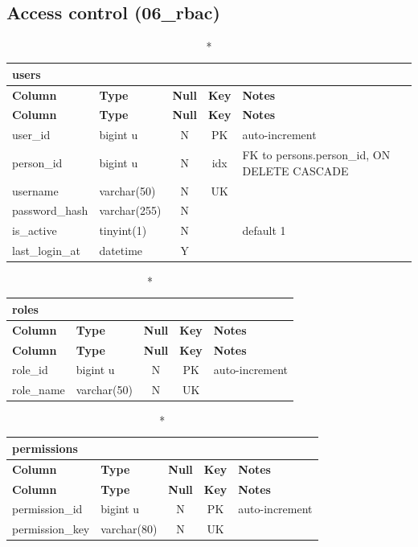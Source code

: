 \subsection*{Access control (06\_rbac)}
\begin{longtable}{@{}p{3.4cm}p{2.9cm}c c p{5.6cm}@{}}
\caption*{\textbf{users}}\\
\toprule \textbf{Column} & \textbf{Type} & \textbf{Null} & \textbf{Key} & \textbf{Notes} \\ \midrule \endfirsthead
\toprule \textbf{Column} & \textbf{Type} & \textbf{Null} & \textbf{Key} & \textbf{Notes} \\ \midrule \endhead
\bottomrule \endlastfoot
user\_\allowbreak{}id & bigint u & N & PK & auto-increment \\
person\_\allowbreak{}id & bigint u & N & idx & FK to persons.person\_\allowbreak{}id, ON DELETE CASCADE \\
username & varchar(50) & N & UK &  \\
password\_\allowbreak{}hash & varchar(255) & N &  &  \\
is\_\allowbreak{}active & tinyint(1) & N &  & default 1 \\
last\_\allowbreak{}login\_\allowbreak{}at & datetime & Y &  &  \\
\end{longtable}
\vspace{-0.4em}
\begin{longtable}{@{}p{3.4cm}p{2.9cm}c c p{5.6cm}@{}}
\caption*{\textbf{roles}}\\
\toprule \textbf{Column} & \textbf{Type} & \textbf{Null} & \textbf{Key} & \textbf{Notes} \\ \midrule \endfirsthead
\toprule \textbf{Column} & \textbf{Type} & \textbf{Null} & \textbf{Key} & \textbf{Notes} \\ \midrule \endhead
\bottomrule \endlastfoot
role\_\allowbreak{}id & bigint u & N & PK & auto-increment \\
role\_\allowbreak{}name & varchar(50) & N & UK &  \\
\end{longtable}
\vspace{-0.4em}
\begin{longtable}{@{}p{3.4cm}p{2.9cm}c c p{5.6cm}@{}}
\caption*{\textbf{permissions}}\\
\toprule \textbf{Column} & \textbf{Type} & \textbf{Null} & \textbf{Key} & \textbf{Notes} \\ \midrule \endfirsthead
\toprule \textbf{Column} & \textbf{Type} & \textbf{Null} & \textbf{Key} & \textbf{Notes} \\ \midrule \endhead
\bottomrule \endlastfoot
permission\_\allowbreak{}id & bigint u & N & PK & auto-increment \\
permission\_\allowbreak{}key & varchar(80) & N & UK &  \\
\end{longtable}
